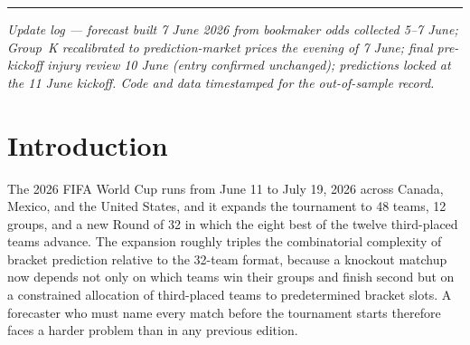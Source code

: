 \documentclass[11pt,letterpaper]{article}
\begin{document}
\begin{center}
\rule{0.6\textwidth}{0.4pt}
\end{center}

\begin{center}
\footnotesize\itshape
Update log --- forecast built 7 June 2026 from bookmaker odds collected 5--7 June;
Group~K recalibrated to prediction-market prices the evening of 7 June;
final pre-kickoff injury review 10 June (entry confirmed unchanged);
predictions locked at the 11 June kickoff. Code and data timestamped for the out-of-sample record.
\end{center}

\section{Introduction}

The 2026 FIFA World Cup runs from June 11 to July 19, 2026 across Canada, Mexico, and the United States, and it expands the tournament to 48 teams, 12 groups, and a new Round of 32 in which the eight best of the twelve third-placed teams advance. The expansion roughly triples the combinatorial complexity of bracket prediction relative to the 32-team format, because a knockout matchup now depends not only on which teams win their groups and finish second but on a constrained allocation of third-placed teams to predetermined bracket slots. A forecaster who must name every match before the tournament starts therefore faces a harder problem than in any previous edition.
\end{document}
